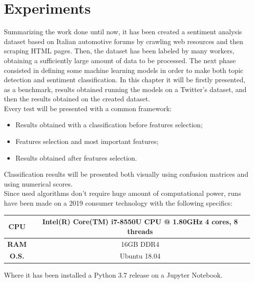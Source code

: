 
\chapter{Experiments}
\label{experiments}

Summarizing the work done until now, it has been created a sentiment analysis dataset based on Italian automotive forums by crawling web resources and then scraping HTML pages. Then, the dataset has been labeled by many workers, obtaining a sufficiently large amount of data to be processed. The next phase consisted in defining some machine learning models in order to make both topic detection and sentiment classification. In this chapter it will be firstly presented, as a benchmark, results obtained running the models on a Twitter's dataset, and then the results obtained on the created dataset.\\
Every test will be presented with a common framework: 
\begin{itemize}
	\item Results obtained with a classification before features selection;
	\item Features selection and most important features;
	\item Results obtained after features selection.
\end{itemize}
Classification results will be presented both visually using confusion matrices and using numerical scores.\\
Since used algorithms don't require huge amount of computational power, runs have been made on a 2019 consumer technology with the following specifics:
\begin{center}
	\begin{tabular}{ |c||c| } 
		\hline
		\textbf{CPU} & Intel(R) Core(TM) i7-8550U CPU @ 1.80GHz 4 cores, 8 threads\\ 
		\hline
		\textbf{RAM} & 16GB DDR4 \\
		\hline
		\textbf{O.S.} & Ubuntu 18.04 \\
		\hline
	\end{tabular}
\end{center}
Where it has been installed a Python 3.7 release on a Jupyter Notebook.


